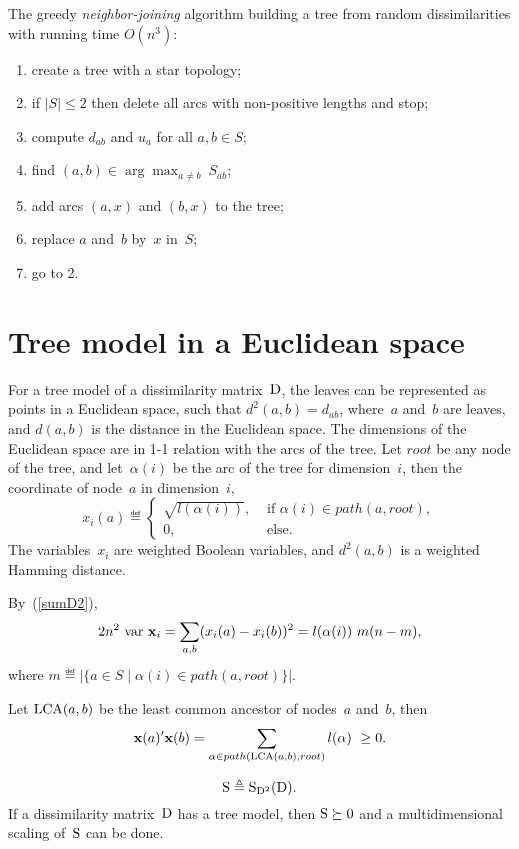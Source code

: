 \documentclass[10pt,a4paper]{article}
\theoremstyle{plain} \newtheorem{Lem}{Lemma}
\begin{document}
The greedy {\em neighbor-joining} algorithm building a tree from random dissimilarities
with running time $O\left(n^3\right)$:
\begin{enumerate}
  \item create a tree with a star topology;
  \item if $|S| \le 2$ then delete all arcs with non-positive lengths and stop;
  \item compute $d_{ab}$ and $u_a$ for all $a,b \in S$;
  \item find $(a,b) \in \arg \max_{a \ne b} \ S_{ab}$;
  \item add arcs $(a,x)$ and $(b,x)$ to the tree;
  \item replace $a$ and~$b$ by~$x$ in~$S$;
  \item go to 2.
\end{enumerate}


\section{Tree model in a Euclidean space}
For a tree model of a dissimilarity matrix~$\mathrm D$, the leaves can be represented as points in a Euclidean space, 
such that $d^2(a,b) = d_{ab}$,
where~$a$ and~$b$ are leaves,
and $d(a,b)$ is the distance in the Euclidean space.
The dimensions of the Euclidean space are in 1-1 relation with the arcs of the tree.
Let $root$ be any node of the tree,
and let~$\alpha(i)$ be the arc of the tree for dimension~$i$,
then the coordinate of node~$a$ in dimension~$i$,
\begin{equation*}
x_i(a) \eqdef 
\begin{cases}
\sqrt{l(\alpha(i))}, &\text{ if } \alpha(i) \in path(a,root),\\
0,   &\text{ else.}
\end{cases}
\end{equation*}
The variables~$x_i$ are weighted Boolean variables,
and $d^2(a,b)$ is a weighted Hamming distance.

By~(\ref{sumD2}),
$$ 2 n^2 \ \mathrm {var} \  \mathbf x_i = \sum_{a,b} (x_i(a) - x_i(b))^2 = l(\alpha(i)) \ m (n - m), $$
where $m \eqdef |\{a \in S \mid \alpha(i) \in path(a,root)\}|$.

Let $\mathrm {LCA}(a,b)$ be the least common ancestor of nodes~$a$ and~$b$, then
$$ \mathbf x(a)' \mathbf x(b) = \sum_{\alpha \in path(\mathrm {LCA}(a,b),root)} l(\alpha) \ \ge 0. $$

$$ \mathrm S \triangleq \mathrm S_{\mathrm D^2}(\mathrm D). $$
If a dissimilarity matrix~$\mathrm D$ has a tree model, then $\mathrm S \succeq 0$ and a multidimensional scaling of~$\mathrm S$ can be done.
\end{document}
